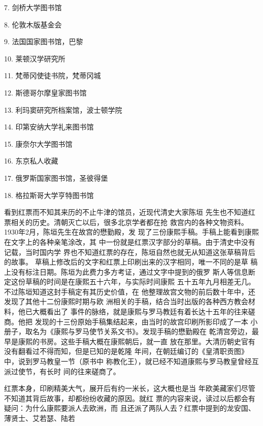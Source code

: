 7. 剑桥大学图书馆%
\par
8. 伦敦木版基金会%
\par
9. 法国国家图书馆，巴黎%
\par
10. 莱顿汉学研究所%
\par
11. 梵蒂冈使徒书院，梵蒂冈城%
\par
12. 斯德哥尔摩皇家图书馆%
\par
13. 利玛窦研究所档案馆，波士顿学院%
\par
14. 印第安纳大学礼来图书馆%
\par
15. 康奈尔大学图书馆%
\par
16. 东京私人收藏%
\par
17. 俄罗斯国家图书馆，圣彼得堡%
\par
18. 格拉斯哥大学亨特图书馆%
\par
看到红票而不知其来历的不止牛津的馆员，近现代清史大家陈垣%
先生也不知道红票相关的历史。清朝灭亡以后，很多北京学者都在抢%
救宫内的各种文物资料。1930年2月，陈垣先生在故宫的懋勤殿，发%
现了三份康熙手稿。手稿上能看到康熙在文字上的各种亲笔涂改，其%
中一份就是红票汉字部分的草稿。由于清史中没有记载，当时国内学%
界也不知道红票的存在，陈垣自然也就无从知道这张草稿背后的故事。%
草稿上修改后的文字和红票上印刷出来的汉字相同，唯一不同的是草%
稿上没有标注日期。陈垣为此费力多方考证，通过文字中提到的俄罗%
斯人等信息断定这份草稿的时间是在康熙五十六年，与实际时间康熙%
五十五年九月相差无几。不过陈垣知道这封手稿定有其历史价值，在%
他整理故宫文物的前后数十年中，还发现了其他十二份康熙时期与欧%
洲相关的手稿，结合当时出版的各种西方教会材料，他已大概看出了%
事件的脉络，就是康熙与罗马教廷有着长达十五年的往来磋商。他把%
发现的十三份原始手稿集结起来，由当时的故宫印刷所影印成了一本%
小册子，取名为《康熙与罗马使节关系文书》。发现手稿的懋勤殿在%
乾清宫旁边，最早是康熙的书房。这些手稿大概在康熙朝后，就一直%
放在那里。大清历朝史官有没有翻看过不得而知，但是已知的是乾隆%
年间，在朝廷编订的《皇清职贡图》中，说到罗马教皇一节（原书中%
称教化王），就已经不知道康熙与罗马教皇曾经互派过使节，有长时%
间的往来磋商了。%
\par
红票本身，印刷精美大气，展开后有约一米长，这大概也是当%
年欧美藏家们尽管不知道其背后故事，却都纷纷收藏的原因。就红%
票的内容来说，读过以后都会有疑问：为什么康熙要派人去欧洲，而%
且还派了两队人去？红票中提到的龙安国、薄贤士、艾若瑟、陆若%
